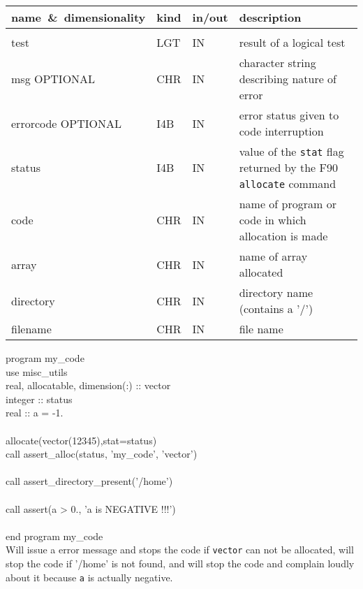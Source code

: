 \begin{arguments}
{
\begin{tabular}{p{0.30\hsize} p{0.05\hsize} p{0.08\hsize} p{0.47\hsize}} \hline  
\textbf{name~\&~dimensionality} & \textbf{kind} & \textbf{in/out} & \textbf{description} \\ \hline
                   &   &   &                           \\ %
test & LGT & IN & result of a logical test \\
msg \hfill OPTIONAL & CHR & IN & character string describing nature of error \\
errorcode \hfill OPTIONAL & I4B & IN & error status given to code interruption \\
status & I4B & IN & value of the {\tt stat} flag returned by the F90 {\tt allocate} command \\
code & CHR & IN & name of program or code in which allocation is made \\
array & CHR & IN & name of array allocated \\
directory & CHR & IN & directory name (contains a '/')\\
filename & CHR & IN & file name \\
\end{tabular}
}
\end{arguments}


\begin{example}
{
program my\_code \\
use misc\_utils \\
real, allocatable, dimension(:) :: vector\\
integer :: status \\
real :: a = -1. \\
\\
allocate(vector(12345),stat=status) \\
call assert\_alloc(status, 'my\_code', 'vector') \\
\\
call assert\_directory\_present('/home') \\
\\
call assert(a > 0., 'a is NEGATIVE !!!') \\
\\
end program my\_code\\
}
{ Will issue a error message and stops the code if {\tt vector} can not be allocated, will stop the
  code if '/home' is not found, and will stop the code and complain loudly about it 
because {\tt a} is actually negative.
}
\end{example}

